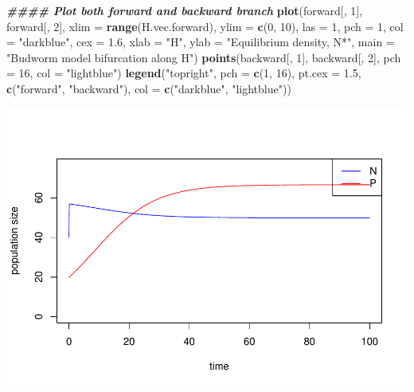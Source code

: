 \documentclass[
]{book}
\newenvironment{Shaded}{\begin{snugshade}}{\end{snugshade}}
\newcommand{\AttributeTok}[1]{\textcolor[rgb]{0.13,0.29,0.53}{#1}}
\newcommand{\DecValTok}[1]{\textcolor[rgb]{0.00,0.00,0.81}{#1}}
\newcommand{\DocumentationTok}[1]{\textcolor[rgb]{0.56,0.35,0.01}{\textbf{\textit{#1}}}}
\newcommand{\FloatTok}[1]{\textcolor[rgb]{0.00,0.00,0.81}{#1}}
\newcommand{\FunctionTok}[1]{\textcolor[rgb]{0.13,0.29,0.53}{\textbf{#1}}}
\newcommand{\NormalTok}[1]{#1}
\newcommand{\StringTok}[1]{\textcolor[rgb]{0.31,0.60,0.02}{#1}}
\begin{document}
\begin{Shaded}
\begin{Highlighting}[]
\DocumentationTok{\#\#\#\# Plot both forward and backward branch}
\FunctionTok{plot}\NormalTok{(forward[, }\DecValTok{1}\NormalTok{], forward[, }\DecValTok{2}\NormalTok{],}
     \AttributeTok{xlim =} \FunctionTok{range}\NormalTok{(H.vec.forward), }\AttributeTok{ylim =} \FunctionTok{c}\NormalTok{(}\DecValTok{0}\NormalTok{, }\DecValTok{10}\NormalTok{), }\AttributeTok{las =} \DecValTok{1}\NormalTok{, }\AttributeTok{pch =} \DecValTok{1}\NormalTok{, }\AttributeTok{col =} \StringTok{"darkblue"}\NormalTok{, }\AttributeTok{cex =} \FloatTok{1.6}\NormalTok{,}
     \AttributeTok{xlab =} \StringTok{"H"}\NormalTok{, }\AttributeTok{ylab =} \StringTok{"Equilibrium density, N*"}\NormalTok{, }\AttributeTok{main =} \StringTok{"Budworm model bifurcation along H"}\NormalTok{)}
\FunctionTok{points}\NormalTok{(backward[, }\DecValTok{1}\NormalTok{], backward[, }\DecValTok{2}\NormalTok{], }\AttributeTok{pch =} \DecValTok{16}\NormalTok{, }\AttributeTok{col =} \StringTok{"lightblue"}\NormalTok{)}
\FunctionTok{legend}\NormalTok{(}\StringTok{"topright"}\NormalTok{, }\AttributeTok{pch =} \FunctionTok{c}\NormalTok{(}\DecValTok{1}\NormalTok{, }\DecValTok{16}\NormalTok{), }\AttributeTok{pt.cex =} \FloatTok{1.5}\NormalTok{, }\FunctionTok{c}\NormalTok{(}\StringTok{"forward"}\NormalTok{, }\StringTok{"backward"}\NormalTok{),}
       \AttributeTok{col =} \FunctionTok{c}\NormalTok{(}\StringTok{"darkblue"}\NormalTok{, }\StringTok{"lightblue"}\NormalTok{))}
\end{Highlighting}
\end{Shaded}

\includegraphics{bookdown-demo_files/figure-latex/unnamed-chunk-31-1.pdf}

  
\end{document}
